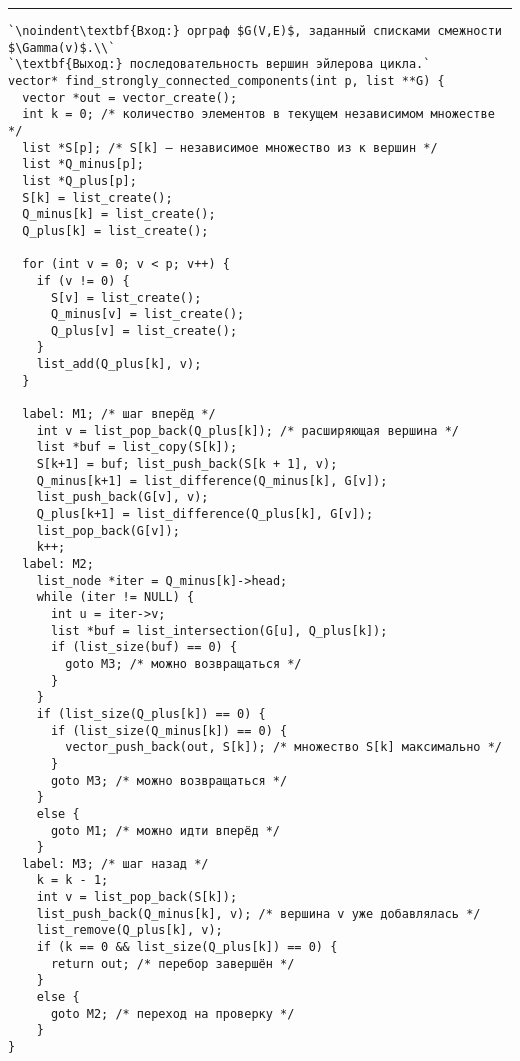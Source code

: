 \vspace{5pt} \hrule
\begin{lstlisting}[caption={Построение максимальных независимых множеств}, label=p352_max_independent_set_construction, escapechar=`]
`\noindent\textbf{Вход:} орграф $G(V,E)$, заданный списками смежности $\Gamma(v)$.\\`
`\textbf{Выход:} последовательность вершин эйлерова цикла.`
vector* find_strongly_connected_components(int p, list **G) {
  vector *out = vector_create();
  int k = 0; /* количество элементов в текущем независимом множестве */
  list *S[p]; /* S[k] — независимое множество из к вершин */
  list *Q_minus[p];
  list *Q_plus[p];
  S[k] = list_create();
  Q_minus[k] = list_create();
  Q_plus[k] = list_create();

  for (int v = 0; v < p; v++) {
    if (v != 0) {
      S[v] = list_create();
      Q_minus[v] = list_create();
      Q_plus[v] = list_create();
    }
    list_add(Q_plus[k], v);
  }

  label: M1; /* шаг вперёд */
    int v = list_pop_back(Q_plus[k]); /* расширяющая вершина */
    list *buf = list_copy(S[k]);
    S[k+1] = buf; list_push_back(S[k + 1], v);
    Q_minus[k+1] = list_difference(Q_minus[k], G[v]);
    list_push_back(G[v], v);
    Q_plus[k+1] = list_difference(Q_plus[k], G[v]);
    list_pop_back(G[v]);
    k++;
  label: M2;
    list_node *iter = Q_minus[k]->head;
    while (iter != NULL) {
      int u = iter->v;
      list *buf = list_intersection(G[u], Q_plus[k]);
      if (list_size(buf) == 0) {
        goto M3; /* можно возвращаться */
      }
    }
    if (list_size(Q_plus[k]) == 0) {
      if (list_size(Q_minus[k]) == 0) {
        vector_push_back(out, S[k]); /* множество S[k] максимально */
      }
      goto M3; /* можно возвращаться */
    }
    else {
      goto M1; /* можно идти вперёд */
    }
  label: M3; /* шаг назад */
    k = k - 1;
    int v = list_pop_back(S[k]);
    list_push_back(Q_minus[k], v); /* вершина v уже добавлялась */
    list_remove(Q_plus[k], v);
    if (k == 0 && list_size(Q_plus[k]) == 0) {
      return out; /* перебор завершён */
    }
    else {
      goto M2; /* переход на проверку */
    }
}
\end{lstlisting}
